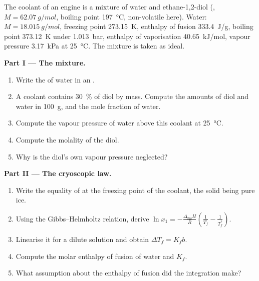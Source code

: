 \begin{problem}
\label{pb:b2:chemical-potential:1}
The coolant of an engine is a mixture of water and ethane-1,2-diol
(, $M = \qty{62.07}{g/mol}$, boiling point \qty{197}{\celsius},
non-volatile here). Water: $M = \qty{18.015}{g/mol}$, freezing point
\qty{273.15}{K}, enthalpy of fusion \qty{333.4}{J/g}, boiling point
\qty{373.12}{K} under \qty{1.013}{bar}, enthalpy of vaporisation
\qty{40.65}{kJ/mol}, vapour pressure \qty{3.17}{kPa} at \qty{25}{\celsius}.
The mixture is taken as ideal.

\medskip
\noindent\textbf{Part I --- The mixture.}
\begin{enumerate}
  \item Write the  of water in an .
  \item A coolant contains \qty{30}{\percent} of diol by mass. Compute the
        amounts of diol and water in \qty{100}{g}, and the mole fraction of
        water.
  \item Compute the vapour pressure of water above this coolant at
        \qty{25}{\celsius}.
  \item Compute the molality of the diol.
  \item Why is the diol's own vapour pressure neglected?
\end{enumerate}

\medskip
\noindent\textbf{Part II --- The cryoscopic law.}
\begin{enumerate}[resume]
  \item Write the equality of  at the freezing point of
        the coolant, the solid being pure ice.
  \item Using the Gibbs--Helmholtz relation, derive $\ln x_1 =
        -\frac{\Delta_{\text{fus}}H}{R}\left(\frac1{T_f} - \frac1{T_f^*}\right)$.
  \item Linearise it for a dilute solution and obtain $\Delta T_f = K_f b$.
  \item Compute the molar enthalpy of fusion of water and $K_f$.
  \item What assumption about the enthalpy of fusion did the integration
        make?
\end{enumerate}


\end{problem}
